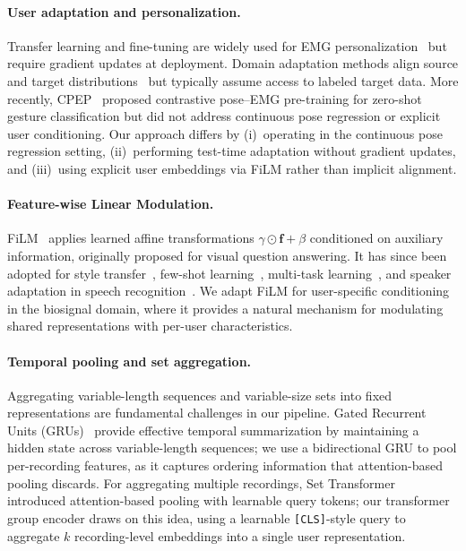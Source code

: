 \documentclass[10pt]{article}
\begin{document}
\paragraph{User adaptation and personalization.}
Transfer learning and fine-tuning are widely used for EMG personalization~\citep{cote2019deep, du2017surface} but require gradient updates at deployment. Domain adaptation methods align source and target distributions~\citep{ganin2016domain} but typically assume access to labeled target data. More recently, CPEP~\citep{cui2025cpep} proposed contrastive pose--EMG pre-training for zero-shot gesture classification but did not address continuous pose regression or explicit user conditioning. Our approach differs by (i)~operating in the continuous pose regression setting, (ii)~performing test-time adaptation without gradient updates, and (iii)~using explicit user embeddings via FiLM rather than implicit alignment.

\paragraph{Feature-wise Linear Modulation.}
FiLM~\citep{perez2018film} applies learned affine transformations $\gamma \odot \mathbf{f} + \beta$ conditioned on auxiliary information, originally proposed for visual question answering. It has since been adopted for style transfer~\citep{dumoulin2017learned}, few-shot learning~\citep{oreshkin2018tadam}, multi-task learning~\citep{strezoski2019many}, and speaker adaptation in speech recognition~\citep{zhao2019adaptive}. We adapt FiLM for user-specific conditioning in the biosignal domain, where it provides a natural mechanism for modulating shared representations with per-user characteristics.

\paragraph{Temporal pooling and set aggregation.}
Aggregating variable-length sequences and variable-size sets into fixed representations are fundamental challenges in our pipeline. Gated Recurrent Units (GRUs)~\citep{cho2014gru} provide effective temporal summarization by maintaining a hidden state across variable-length sequences; we use a bidirectional GRU to pool per-recording features, as it captures ordering information that attention-based pooling discards. For aggregating multiple recordings, Set Transformer~\citep{lee2019set} introduced attention-based pooling with learnable query tokens; our transformer group encoder draws on this idea, using a learnable \texttt{[CLS]}-style query to aggregate $k$ recording-level embeddings into a single user representation.
\end{document}
